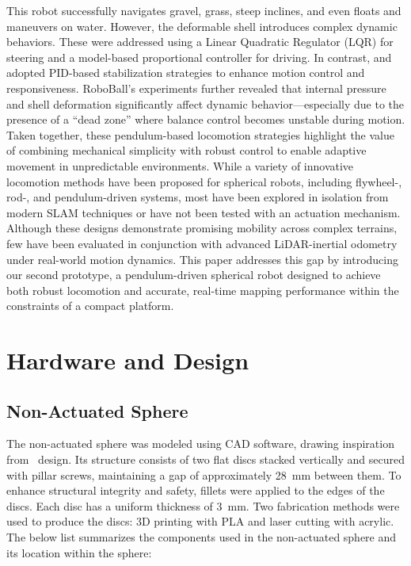 \documentclass[conference]{IEEEtran}
\begin{document}
This robot successfully navigates gravel, grass, steep inclines, and even floats and maneuvers on water. 
However, the deformable shell introduces complex dynamic behaviors. 
These were addressed using a Linear Quadratic Regulator (LQR) for steering and a model-based proportional controller for driving. 
In contrast, \cite{novelsphere} and \cite{pendulum_sphere} adopted PID-based stabilization strategies to enhance motion control and responsiveness. 
RoboBall’s experiments further revealed that internal pressure and shell deformation significantly affect dynamic behavior—especially due to the presence of a ``dead zone'' where balance control becomes unstable during motion.
Taken together, these pendulum-based locomotion strategies highlight the value of combining mechanical simplicity with robust control to enable adaptive movement in unpredictable environments. 
While a variety of innovative locomotion methods have been proposed for spherical robots, including flywheel-, rod-, and pendulum-driven systems, most have been explored in isolation from modern SLAM techniques or have not been tested with an actuation mechanism. 
Although these designs demonstrate promising mobility across complex terrains, few have been evaluated in conjunction with advanced LiDAR-inertial odometry under real-world motion dynamics. 
This paper addresses this gap by introducing our second prototype, a pendulum-driven spherical robot designed to achieve both robust locomotion and accurate, real-time mapping performance within the constraints of a compact platform.

\section{Hardware and Design}
\label{sec:hardwaredesing}
\subsection{Non-Actuated Sphere}

The non-actuated sphere was modeled using CAD software, drawing inspiration from~\cite{Kalman_filter_sphere} design. 
Its structure consists of two flat discs stacked vertically and secured with pillar screws, maintaining a gap of approximately \SI{28}{\milli\meter} between them. 
To enhance structural integrity and safety, fillets were applied to the edges of the discs. 
Each disc has a uniform thickness of \SI{3}{\milli\meter}.
Two fabrication methods were used to produce the discs: 3D printing with PLA and laser cutting with acrylic. 
The below list summarizes the components used in the non-actuated sphere and its location within the sphere:
\end{document}
